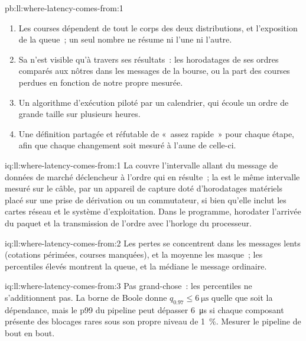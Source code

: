 \begin{solution}{pb:ll:where-latency-comes-from:1}
\begin{enumerate}
\item Les courses dépendent de tout le corps des deux distributions, et l'exposition de la queue~; un seul nombre ne résume ni l'une ni l'autre.
\item Sa  n'est visible qu'à travers ses résultats~: les horodatages de ses ordres comparés aux nôtres dans les
messages de la bourse, ou la part des courses perdues en fonction de notre propre  mesurée.
\item Un algorithme d'exécution piloté par un calendrier, qui écoule un ordre de grande taille sur plusieurs heures.
\item Une définition partagée et réfutable de «~assez rapide~» pour chaque étape, afin que chaque changement soit mesuré à l'aune de celle-ci.
\end{enumerate}
\end{solution}

\begin{solution}{iq:ll:where-latency-comes-from:1}
La  couvre l'intervalle allant du message de données de marché déclencheur à l'ordre qui en résulte~; la  est le même
intervalle mesuré sur le câble, par un appareil de capture doté d'horodatages matériels placé sur une prise de dérivation ou un commutateur, si bien qu'elle inclut les cartes réseau
et le système d'exploitation. Dans le programme, horodater l'arrivée du paquet et la transmission de l'ordre avec
l'horloge du processeur.
\end{solution}

\begin{solution}{iq:ll:where-latency-comes-from:2}
Les pertes se concentrent dans les messages lents (cotations périmées, courses manquées), et la moyenne les masque~; les percentiles élevés montrent
la queue, et la médiane le message ordinaire.
\end{solution}

\begin{solution}{iq:ll:where-latency-comes-from:3}
Pas grand-chose~: les percentiles ne s'additionnent pas. La borne de Boole donne $q_{0.97} \le \qty{6}{\micro\second}$ quelle que soit la dépendance, mais
le p99 du pipeline peut dépasser \qty{6}{\micro\second} si chaque composant présente des blocages rares sous son propre niveau de 1~\%. Mesurer le
pipeline de bout en bout.
\end{solution}

